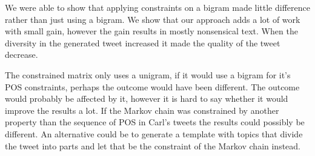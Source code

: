 \documentclass[a4paper,12pt]{article}
\begin{document}
We were able to show that applying constraints on a bigram made little difference rather than just using a bigram. We show that our approach adds a lot of work with small gain, however the gain results in mostly nonsensical text. When the diversity in the generated tweet increased it made the quality of the tweet decrease.

The constrained matrix only uses a unigram, if it would use a bigram for it's POS constraints, perhaps the outcome would have been different. The outcome would probably be affected by it, however it is hard to say whether it would improve the results a lot. If the Markov chain was constrained by another property than the sequence of POS in Carl's tweets the results could possibly be different. An alternative could be to generate a template with topics that divide the tweet into parts and let that be the constraint of the Markov chain instead.

\newpage


\end{document}
